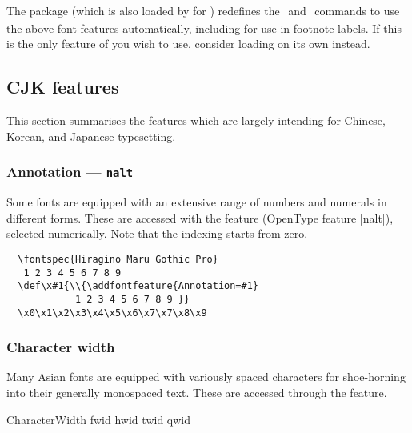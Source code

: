 \documentclass[a4paper]{l3doc}
\begin{document}
The  package
(which is also loaded by  for \XeTeX)
redefines the \cmd\textsubscript\ and
\cmd\textsuperscript\ commands to use the above font features automatically,
including for use in footnote labels.
If this is the only feature of  you wish to use, consider
loading  on its own instead.



\subsection{CJK features}

This section summarises the features which are largely intending for Chinese, Korean,
and Japanese typesetting.


\subsubsection{Annotation --- \texttt{nalt} }

Some fonts are equipped with an extensive range of
numbers and numerals in different forms. These are accessed with the
 feature (OpenType feature |nalt|), selected numerically.
Note that the indexing starts from zero.
\begin{Verbatim}
  \fontspec{Hiragino Maru Gothic Pro}
   1 2 3 4 5 6 7 8 9
  \def\x#1{\\{\addfontfeature{Annotation=#1}
            1 2 3 4 5 6 7 8 9 }}
  \x0\x1\x2\x3\x4\x5\x6\x7\x7\x8\x9
\end{Verbatim}


\subsubsection{Character width}\label{sec:CharacterWidth}

Many Asian fonts are equipped with variously spaced characters for
shoe-horning into their generally monospaced text.
These are
accessed through the  feature.

\begin{features}{CharacterWidth}
        {fwid}
        {hwid}
       {twid}
     {qwid}
\end{features}
\end{document}
